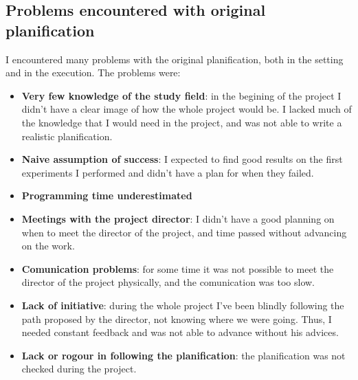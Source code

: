 \documentclass{article}
\begin{document}

    \subsection{Problems encountered with original planification}
    I encountered many problems with the original planification, both in the
    setting and in the execution. The problems were:
    \begin{itemize}
        \item \textbf{Very few knowledge of the study field}: in the begining of the project I didn't have a clear image of how the whole project
        would be. I lacked much of the knowledge that I would need in the
        project, and was not able to write a realistic planification.
        \item \textbf{Naive assumption of success}: I expected to find good
        results on the first experiments I performed and didn't have a plan for
        when they failed.
        \item \textbf{Programming time underestimated}
        \item \textbf{Meetings with the project director}: I didn't have a good
        planning on when to meet the director of the project, and time passed
        without advancing on the work.
        \item \textbf{Comunication problems}: for some time it was not possible
        to meet the director of the project physically, and the comunication
        was too slow.
        \item \textbf{Lack of initiative}: during the whole project I've been
        blindly following the path proposed by the director, not knowing where
        we were going. Thus, I needed constant feedback and was not able to
        advance without his advices.
        \item \textbf{Lack or rogour in following the planification}:
        the planification was not checked during the project.
    \end{itemize}
\end{document}
